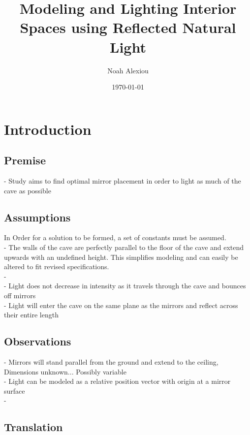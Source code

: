 \documentclass[11pt, letterpaper]{article}
\begin{document}
\title{Modeling and Lighting Interior Spaces using Reflected Natural Light}
\author{Noah Alexiou}
\date{\today}
\maketitle
\newpage
\tableofcontents
\newpage


\section{Introduction}


\subsection{Premise}
- Study aims to find optimal mirror placement in order to light as much of the cave as possible




\subsection{Assumptions}
\par
In Order for a solution to be formed, a set of constants must be assumed.
\\
- The walls of the cave are perfectly parallel to the floor of the cave and extend upwards with an undefined height. This simplifies modeling and can easily be altered to fit revised specifications.
\\
- 
\\
- Light does not decrease in intensity as it travels through the cave and bounces off mirrors
\\
- Light will enter the cave on the same plane as the mirrors and reflect across their entire length
\\


\subsection{Observations}
\par

- Mirrors will stand parallel from the ground and extend to the ceiling, Dimensions unknown... Possibly variable
\\
- Light can be modeled as a relative position vector with origin at a mirror surface
\\
- 


\subsection{Translation}
\end{document}
